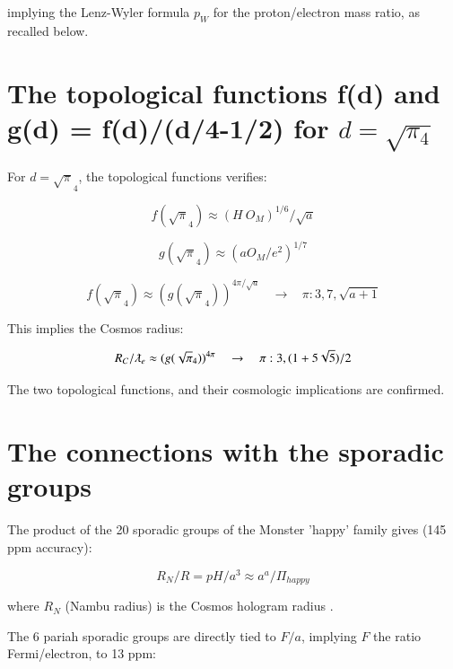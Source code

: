 \documentclass[a4paper,9pt]{article}
\begin{document}
implying the Lenz-Wyler formula $p_W$ for the proton/electron mass ratio, as recalled below.






 
\section{The topological functions f(d) and g(d) = f(d)/(d/4-1/2) for $d = \sqrt {\pi_4}$}

For $d = \sqrt\pi_4$, the topological functions verifies:

\begin{equation}
f(\sqrt\pi_4) \approx (H~O_M)^{1/6}/\sqrt a  
\end{equation} 

\begin{equation}
g(\sqrt\pi_4) \approx (aO_M/e^2)^{1/7}  
\end{equation} 


\begin{equation}
f(\sqrt\pi_4) \approx (g(\sqrt\pi_4))^{4\pi/\sqrt a}  ~~~~\rightarrow ~~~~ \pi : 3,7,\sqrt{a+1}
\end{equation} 

This implies the Cosmos radius:

\begin{equation}
R_C/\lambdabar_e \approx (g(\sqrt\pi_4))^{4\pi}  ~~~~\rightarrow ~~~~  \pi : 3,(1+5\sqrt 5)/2
\end{equation} 

The two topological functions, and their cosmologic implications are confirmed.







 
 \section{The connections with the sporadic groups }

The product of the 20 sporadic groups of the Monster 'happy' family gives (145 ppm accuracy):

\begin{equation}
 R_N/R = pH/a^3 \approx a^a /\Pi_{happy}
\end{equation}

where $R_N$ (Nambu radius) is the Cosmos hologram radius \cite {Sanchez}. 

The 6 pariah sporadic groups are directly tied to $F/a$, implying $F$ the ratio Fermi/electron, to 13 ppm:
\end{document}
